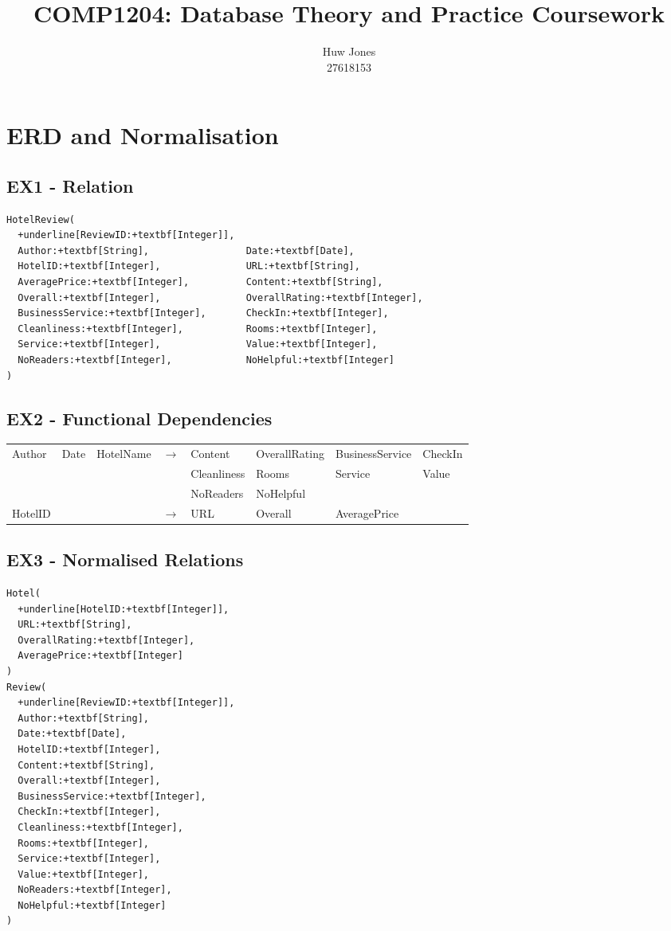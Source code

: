 \documentclass[a4paper]{article}
\author{Huw Jones \\27618153}
\title{COMP1204: Database Theory and Practice Coursework}
\begin{document}
\maketitle

\section{ERD and Normalisation}
\subsection{EX1 - Relation}
\begin{Verbatim}[commandchars=+\[\]]
HotelReview(
  +underline[ReviewID:+textbf[Integer]],
  Author:+textbf[String],                 Date:+textbf[Date],
  HotelID:+textbf[Integer],               URL:+textbf[String],
  AveragePrice:+textbf[Integer],          Content:+textbf[String],
  Overall:+textbf[Integer],               OverallRating:+textbf[Integer],
  BusinessService:+textbf[Integer],       CheckIn:+textbf[Integer],
  Cleanliness:+textbf[Integer],           Rooms:+textbf[Integer],
  Service:+textbf[Integer],               Value:+textbf[Integer],
  NoReaders:+textbf[Integer],             NoHelpful:+textbf[Integer]
)
\end{Verbatim}

\subsection{EX2 - Functional Dependencies}
\begin{tabular}{l l l c l l l l}
Author & Date & HotelName & $\to$ & Content & OverallRating & BusinessService & CheckIn \\
&&&& Cleanliness & Rooms & Service & Value \\
&&&& NoReaders & NoHelpful & & \\
HotelID & & & $\to$ & URL & Overall & AveragePrice & \\
\end{tabular}

\subsection{EX3 - Normalised Relations}
\begin{Verbatim}[commandchars=+\[\]]
Hotel(
  +underline[HotelID:+textbf[Integer]],
  URL:+textbf[String],
  OverallRating:+textbf[Integer],
  AveragePrice:+textbf[Integer]
)
Review(
  +underline[ReviewID:+textbf[Integer]],
  Author:+textbf[String],
  Date:+textbf[Date],
  HotelID:+textbf[Integer],
  Content:+textbf[String],
  Overall:+textbf[Integer],
  BusinessService:+textbf[Integer],
  CheckIn:+textbf[Integer],
  Cleanliness:+textbf[Integer],
  Rooms:+textbf[Integer],
  Service:+textbf[Integer],
  Value:+textbf[Integer],
  NoReaders:+textbf[Integer],
  NoHelpful:+textbf[Integer]
)
\end{Verbatim}
\end{document}
